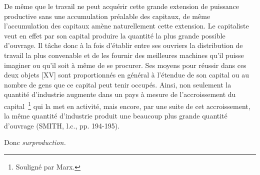 \documentclass[french,twoside]{book} %
\newenvironment{quoteblock}%
  {\begin{quoting}}
  {\end{quoting}}
\newenvironment{quotebar}{%
    \def\FrameCommand{{\color{rubric!10!}\vrule width 0.5em} \hspace{0.9em}}%
    \def\OuterFrameSep{\itemsep} %
    \MakeFramed {\advance\hsize-\width \FrameRestore}
  }%
  {%
    \endMakeFramed
  }
\renewenvironment{quoteblock}%
  {%
    \savenotes
    \setstretch{0.9}
    \normalfont
    \begin{quotebar}
  }
  {%
    \end{quotebar}
    \spewnotes
  }
\begin{document}
\begin{quoteblock}
 De même que le travail ne peut acquérir cette grande extension de puissance productive sans une accumulation préalable des capitaux, de même l’accumulation des capitaux amène naturellement cette extension. Le capitaliste veut en effet par son capital produire la quantité la plus grande possible d’ouvrage. Il tâche donc à la fois d’établir entre ses ouvriers la distribution de travail la plus convenable et de les fournir des meilleures machines qu’il puisse imaginer ou qu’il soit à même de se procurer. Ses moyens pour réussir dans ces deux objets [XV] sont proportionnés en général à l’étendue de son capital ou au nombre de gens que ce capital peut tenir occupés. Ainsi, non seulement la quantité d’industrie augmente dans un pays à mesure de l’accroissement du capital \footnote{Souligné par Marx.} qui la met en activité, mais encore, par une suite de cet accroissement, la même quantité d’industrie produit une beaucoup plus grande quantité d’ouvrage (SMITH, l.c., pp. 194-195).
 \end{quoteblock}

\noindent Donc \emph{surproduction.}\par
\end{document}
